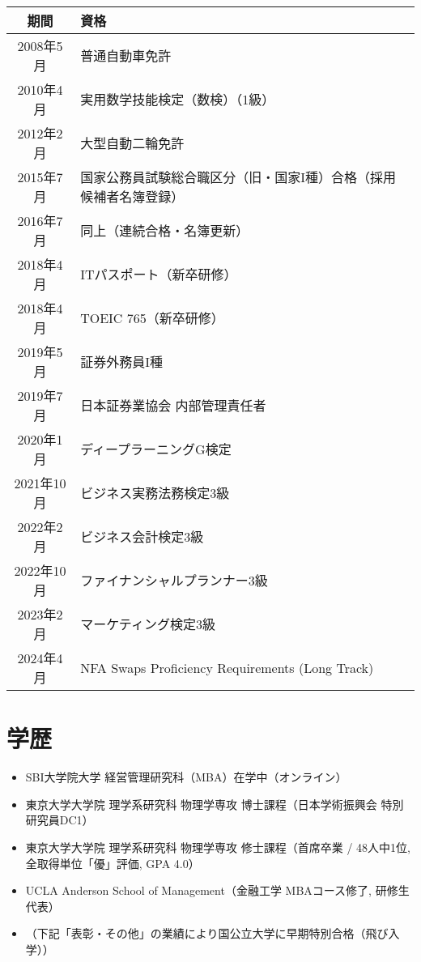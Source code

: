 \documentclass[uplatex,a4j,10.5pt,dvipdfmx]{jsarticle}
\begin{document}
\begin{longtable}{|c|l|}
	\hline
	\centering\textbf{期間} & \textbf{資格}                                     \\
	\hline
	\endhead

	\hline
	2008年5月               & 普通自動車免許                                         \\
	\hline
	2010年4月               & 実用数学技能検定（数検）（1級）                                \\
	\hline
	2012年2月               & 大型自動二輪免許                                        \\
	\hline
	2015年7月               & 国家公務員試験総合職区分（旧・国家I種）合格（採用候補者名簿登録）               \\
	\hline
	2016年7月               & 同上（連続合格・名簿更新）                                   \\
	\hline
	2018年4月               & ITパスポート（新卒研修）                                   \\
	\hline
	2018年4月               & TOEIC 765（新卒研修）                                 \\
	\hline
	2019年5月               & 証券外務員I種                                         \\
	\hline
	2019年7月               & 日本証券業協会 内部管理責任者                                 \\
	\hline
	2020年1月               & ディープラーニングG検定                                    \\
	\hline
	2021年10月              & ビジネス実務法務検定3級                                    \\
	\hline
	2022年2月               & ビジネス会計検定3級                                      \\
	\hline
	2022年10月              & ファイナンシャルプランナー3級                                 \\
	\hline
	2023年2月               & マーケティング検定3級                                     \\
	\hline
	2024年4月               & NFA Swaps Proficiency Requirements (Long Track) \\
	\hline
\end{longtable}

\section{学歴}
\begin{itemize}
	\item SBI大学院大学 経営管理研究科（MBA）在学中（オンライン）
	\item 東京大学大学院 理学系研究科 物理学専攻 博士課程（日本学術振興会 特別研究員DC1）
	\item 東京大学大学院 理学系研究科 物理学専攻 修士課程（首席卒業 / 48人中1位, 全取得単位「優」評価, GPA 4.0）
	\item UCLA Anderson School of Management（金融工学 MBAコース修了, 研修生代表）
	\item （下記「表彰・その他」の業績により国公立大学に早期特別合格（飛び入学））
\end{itemize}
\end{document}
